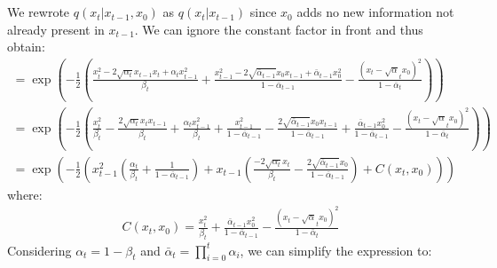 \documentclass{article}
\begin{document}
\\\\
We rewrote $q\left(x_t | x_{t-1}, x_0\right)$ as $q\left(x_t | x_{t-1}\right)$ since $x_0$ adds no new information not already present in $x_{t-1}$. We can ignore the constant factor in front and thus obtain:
\begin{gather}
  = \exp\left(- \frac{1}{2} \left(\frac{x_t^2 - 2 \sqrt{\alpha_t} x_{t-1} x_t + \alpha_t x_{t-1}^2}{\beta_t} + \frac{x_{t-1}^2 - 2 \sqrt{\bar{\alpha}_{t-1}} x_0 x_{t-1} + \bar{\alpha}_{t-1} x_0^2}{ 1 - \bar{\alpha}_{t-1}} - \frac{\left(x_t - \sqrt{\alpha}_t x_0\right)^2}{1 - \bar{\alpha}_{t}}\right) \right) \\
  = \exp\left(- \frac{1}{2} \left(\frac{x_t^2}{\beta_t} - \frac{2 \sqrt{\alpha_t} x_t x_{t-1}}{\beta_t} + \frac{\alpha_t x_{t-1}^2}{\beta_t} + \frac{x_{t-1}^2}{1 - \bar{\alpha}_{t-1}} - \frac{2 \sqrt{\bar{\alpha}_{t-1}} x_0 x_{t-1}}{1 - \bar{\alpha}_{t-1}} + \frac{\bar{\alpha}_{t-1} x_0^2}{1 - \bar{\alpha}_{t-1}} - \frac{\left(x_t - \sqrt{\alpha}_t x_0\right)^2}{1 - \bar{\alpha}_{t}}\right) \right) \\
  = \exp\left(- \frac{1}{2} \left(x_{t-1}^2 \left(\frac{\alpha_t}{\beta_t} + \frac{1}{1 - \bar{\alpha}_{t-1}}\right) + x_{t-1} \left(\frac{-2 \sqrt{\alpha_t} x_t}{\beta_t} - \frac{2 \sqrt{\bar{\alpha}_{t-1}} x_0 }{1 - \bar{\alpha}_{t-1}}\right) + C\left(x_t, x_0\right)\right) \right) 
\end{gather}
where:
\begin{gather}
  C\left(x_t, x_0\right) = \frac{x_t^2}{\beta_t} + \frac{\bar{\alpha}_{t-1} x_0^2}{1 - \bar{\alpha}_{t-1}} - \frac{\left(x_t - \sqrt{\alpha}_t x_0\right)^2}{1 - \bar{\alpha}_{t}}
\end{gather}
Considering $\alpha_t = 1 - \beta_t$ and $\bar{\alpha}_t = \prod_{i=0}^{t}{\alpha_i}$, we can simplify the expression to:
\end{document}
